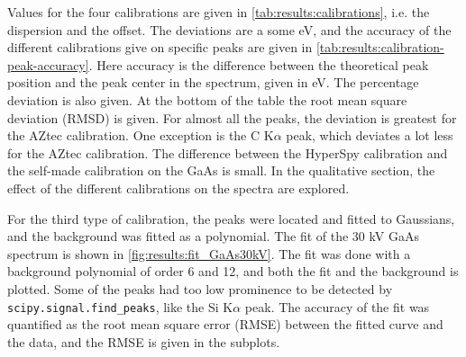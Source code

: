Values for the four calibrations are given in \cref{tab:results:calibrations}, i.e. the dispersion and the offset.
The deviations are a some eV, and the accuracy of the different calibrations give on specific peaks are given in \cref{tab:results:calibration-peak-accuracy}.
Here accuracy is the difference between the theoretical peak position and the peak center in the spectrum, given in eV.
The percentage deviation is also given.
At the bottom of the table the root mean square deviation (RMSD) is given.
For almost all the peaks, the deviation is greatest for the AZtec calibration.
One exception is the C K$\alpha$ peak, which deviates a lot less for the AZtec calibration. %
The difference between the HyperSpy calibration and the self-made calibration on the GaAs is small.
In the qualitative section, the effect of the different calibrations on the spectra are explored.






For the third type of calibration, the peaks were located and fitted to Gaussians, and the background was fitted as a polynomial.
The fit of the 30 kV GaAs spectrum is shown in \cref{fig:results:fit_GaAs30kV}.
The fit was done with a background polynomial of order 6 and 12, and both the fit and the background is plotted.
Some of the peaks had too low prominence to be detected by \verb|scipy.signal.find_peaks|, like the Si K$\alpha$ peak.
The accuracy of the fit was quantified as the root mean square error (RMSE) between the fitted curve and the data, and the RMSE is given in the subplots.



